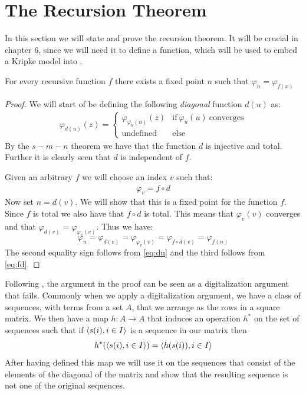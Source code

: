 \documentclass[../main.tex]{subfiles}
\begin{document}
\section{The Recursion Theorem}
In this section we will state and prove the recursion theorem. It will be
crucial in chapter 6, since we will need it to define a function, which will be
used to embed a Kripke model into \PRA.
\begin{thm}
	For every recursive function $f$ there exists a fixed point $n$ such
	that $\varphi_n=\varphi_{f(x)}$
\end{thm}
\begin{proof}
	We will start of be defining the following \textit{diagonal} function
	$d(u)$ as:
	\begin{align}
		\label{eq:du}
		\varphi_{d(u)}(z)=\begin{cases}
		\varphi_{\varphi_u(u)}(z)& \text{if}\ \varphi_u(u)\
		\text{converges}\\
		\text{undefined} & \text{else}
	\end{cases}
	\end{align}
	By the $s-m-n$ theorem we have that the function $d$ is injective and
	total. Further it is clearly seen that $d$ is independent of $f$.

	Given an arbitrary $f$ we will choose an index $v$ such that:
	\begin{align}
		\label{eq:fd}
		\varphi_v=f\circ d
	\end{align}
	Now set $n=d(v)$. We will show that this is a fixed point for the
	function $f$. Since $f$ is total we also have that $f\circ d$ is total.
	This means that $\varphi_v(v)$ converges and that
	$\varphi_{d(v)}=\varphi_{\varphi_v(v)}$. Thus we have:
	\[\varphi_n=\varphi_{d(v)}=\varphi_{\varphi_v(v)}=\varphi_{f\circ
	d(v)}=\varphi_{f(n)}\]
	The second equality sign follows from \ref{eq:du} and the third follows
	from \ref{eq:fd}.
\end{proof}
Following \citet{Owen1973}, the argument in the proof can be seen as a
digitalization argument that fails. Commonly when we apply a digitalization
argument, we have a class of sequences, with terms from a set $A$, that we arrange as the rows in a square
matrix. We then have a map $h:A\rightarrow A$ that induces an operation $h^*$ on
the set of sequences such that if $\langle s(i),i\in I\rangle$ is a sequence in our
matrix then 
\[h^*(\langle s(i),i\in I\rangle)=\langle h(s(i)),i\in I\rangle\]
After having defined this map we will use it on the sequences that consist of
the elements of the  diagonal of the matrix and
show that the resulting sequence is not one of the original sequences. 
\end{document}
